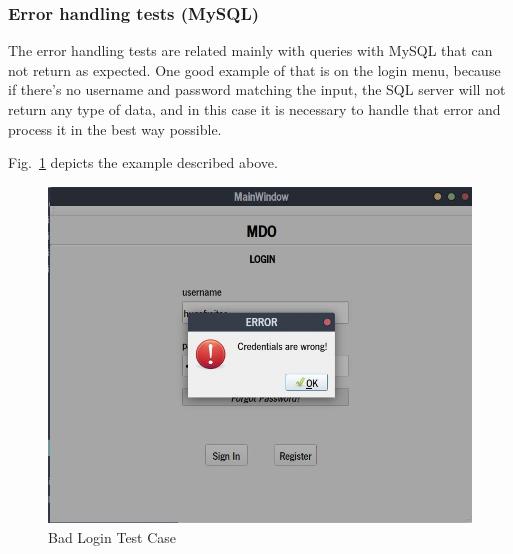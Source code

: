 \subsubsection{Error handling tests (MySQL)}
The error handling tests are related mainly with queries with MySQL that can not return as expected. One good example of that is on the login menu, because if there's no username and password matching the input, the SQL server will not return any type of data, and in this case it is necessary to handle that error and process it in the best way possible.

Fig.~\ref{fig:rc-login-test} depicts the example described above.
%
\begin{figure}[!htb]
    \includegraphics[width=.5\textwidth]{img/rc-login-test.jpg}%
  \caption{Bad Login Test Case}%
  \label{fig:rc-login-test}
\end{figure}

